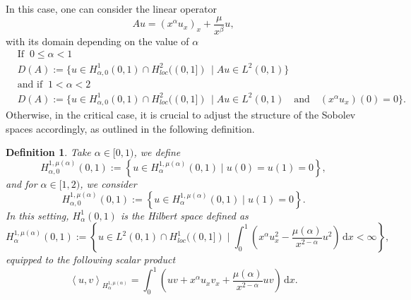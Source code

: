 \documentclass[sn-mathphys]{sn-jnl}
\newtheorem{definition}[theorem]{Definition}
\begin{document}
In this case, one can consider the linear operator
    \begin{equation*}
        Au= (x^{\alpha} u_x)_x + \dfrac{\mu}{x^{\beta}} u,
    \end{equation*}
with its domain depending on the value of $\alpha$
    \begin{equation}\label{DA1}
        \begin{aligned}
            &\text{If}\;\; 0\leq \alpha <1\\
			&D(A):=\big\{u\in H_{\alpha,0}^1(0,1)\cap H_{loc}^2((0,1])\, \mid  Au \in L^2(0,1) \big\}\\
			&\text{and if}\;\; 1< \alpha<2\\
			&D(A):=\big\{u\in H_{\alpha,0}^1(0,1)\cap H_{loc}^2((0,1])\, \mid  Au \in L^2(0,1)\quad \text{and}\quad (x^{\alpha}u_x)(0)=0 \big\}.
		\end{aligned}
  \end{equation}
Otherwise, in the critical case, it is crucial to adjust the structure of the Sobolev spaces accordingly, as outlined in the following definition.
    \begin{definition}
		Take $\alpha \in [0, 1)$, we define
            \begin{equation*}
                H_{\alpha, 0}^{1,\mu(\alpha)}(0,1):=\left\{u \in H_{\alpha}^{1,\mu(\alpha)}(0,1) \mid u(0)=u(1)=0\right\},
            \end{equation*}
		and for $\alpha \in [1, 2)$, we consider
            \begin{equation*}
                H_{\alpha, 0}^{1,\mu(\alpha)}(0,1):=\left\{u \in H_{\alpha}^{1,\mu(\alpha)}(0,1) \mid u(1)=0\right\}.
            \end{equation*}
		In this setting, $H_{\alpha}^{1}(0,1)$ is the Hilbert space defined as
            \begin{equation*}
                H_{\alpha}^{1,\mu(\alpha)}(0,1):=\left\{u \in L^{2}(0,1) \cap H_{l o c}^{1}((0,1]) \mid \int_0^1 \left( x^{\alpha} u_x^2 - \dfrac{\mu(\alpha)}{x^{2-\alpha}} u^2 \right) \,\mathrm{d}x < \infty\right\},
            \end{equation*}
		equipped to the following scalar product
            \begin{equation*}
                \left\langle u , v \right\rangle_{H_{\alpha}^{1,\mu(\alpha)}}= \int_0^1 \left( uv + x^{\alpha} u_x v_x + \dfrac{\mu(\alpha)}{x^{2-\alpha}} u v \right)\,\mathrm{d}x.
            \end{equation*}
	\end{definition}
\end{document}
